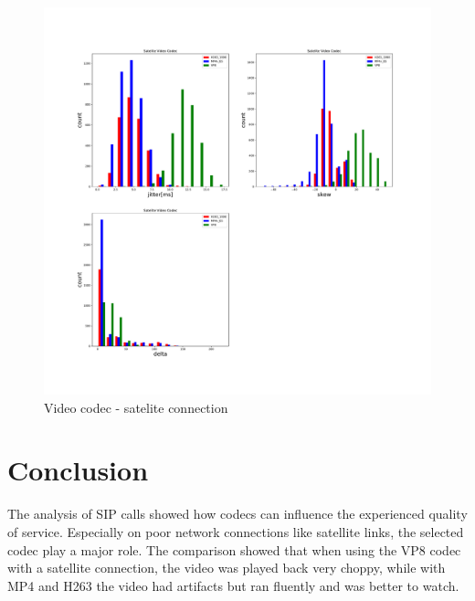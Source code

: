 \documentclass[parskip=full]{scrartcl}
\begin{document}
\begin{figure}[!ht]
	\centering %
	\includegraphics[width=\textwidth]{images/satelite-video-histogram.pdf} %
	\caption{Video codec - satelite connection} 
	\label{fig:Video} %
\end{figure} 

\newpage
\section{Conclusion}

The analysis of SIP calls showed how codecs can influence the experienced quality of service. 
Especially on poor network connections like satellite links, the selected codec play a major role.
The comparison showed that when using the VP8 codec with a satellite connection, the video was played back very choppy, while with MP4 and H263 the video had artifacts but ran fluently and was better to watch.


\printbibliography
\end{document}
